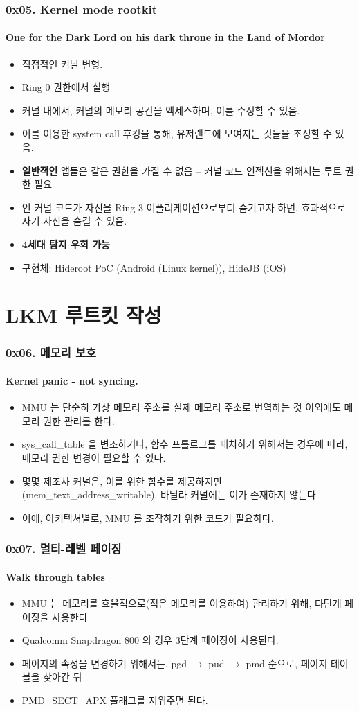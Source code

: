 \begin{frame}
  \frametitle{0x05. Kernel mode rootkit}
  \framesubtitle{One for the Dark Lord on his dark throne in the Land of Mordor}

  \begin{itemize}
  \item <1-> 직접적인 커널 변형.
  \item <2-> Ring 0 권한에서 실행
  \item <3-> 커널 내에서, 커널의 메모리 공간을 액세스하며, 이를 수정할 수 있음.
  \item <4-> 이를 이용한 system call 후킹을 통해, 유저랜드에 보여지는 것들을 조정할 수 있음.
  \item <5-> \textbf{일반적인} 앱들은 같은 권한을 가질 수 없음 -- 커널 코드 인젝션을 위해서는 루트 권한 필요
  \item <6-> 인-커널 코드가 자신을 Ring-3 어플리케이션으로부터 숨기고자 하면, 효과적으로 자기 자신을 숨길 수 있음.
  \item <7-> \textbf{4세대 탐지 우회 가능}
  \item <8-> 구현체: Hideroot PoC (Android (Linux kernel)), HideJB (iOS)
  \end{itemize}
\end{frame}

\section[Section]{LKM 루트킷 작성}
\begin{frame}
  \frametitle{0x06. 메모리 보호}
  \framesubtitle{Kernel panic - not syncing.}

  \begin{itemize}
  \item <1-> MMU 는 단순히 가상 메모리 주소를 실제 메모리 주소로 번역하는 것 이외에도 메모리 권한 관리를 한다.
  \item <2-> sys\_call\_table 을 변조하거나, 함수 프롤로그를 패치하기 위해서는 경우에 따라, 메모리 권한 변경이 필요할 수 있다.
  \item <3-> 몇몇 제조사 커널은, 이를 위한 함수를 제공하지만 (mem\_text\_address\_writable), 바닐라 커널에는 이가 존재하지 않는다
  \item <4-> 이에, 아키텍쳐별로, MMU 를 조작하기 위한 코드가 필요하다.
  \end{itemize}
\end{frame}

\begin{frame}
  \frametitle{0x07. 멀티-레벨 페이징}
  \framesubtitle{Walk through tables}

  \begin{itemize}
  \item <1-> MMU 는 메모리를 효율적으로(적은 메모리를 이용하여) 관리하기 위해, 다단계 페이징을 사용한다
  \item <2-> Qualcomm Snapdragon 800 의 경우 3단계 페이징이 사용된다.
  \item <3-> 페이지의 속성을 변경하기 위해서는, pgd $\rightarrow$ pud $\rightarrow$ pmd 순으로, 페이지 테이블을 찾아간 뒤
  \item <4-> PMD\_SECT\_APX 플래그를 지워주면 된다.
  \end{itemize}
\end{frame}

